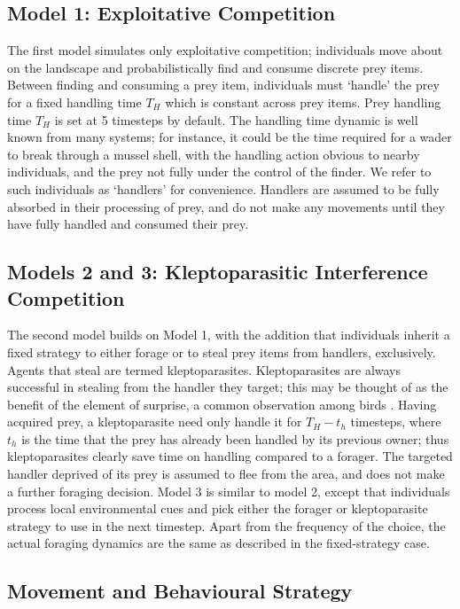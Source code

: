 \documentclass[11pt]{article}
\begin{document}
\subsection{Model 1: Exploitative Competition}

The first model simulates only exploitative competition; individuals move about on the landscape and probabilistically find and consume discrete prey items.
Between finding and consuming a prey item, individuals must `handle' the prey for a fixed handling time $T_H$ which is constant across prey items.
Prey handling time $T_H$ is set at 5 timesteps by default.
The handling time dynamic is well known from many systems; for instance, it could be the time required for a wader to break through a mussel shell, with the handling action obvious to nearby individuals, and the prey not fully under the control of the finder.
We refer to such individuals as `handlers' for convenience.
Handlers are assumed to be fully absorbed in their processing of prey, and do not make any movements until they have fully handled and consumed their prey.

\subsection{Models 2 and 3: Kleptoparasitic Interference Competition}

The second model builds on Model 1, with the addition that individuals inherit a fixed strategy to either forage or to steal prey items from handlers, exclusively.
Agents that steal are termed kleptoparasites.
Kleptoparasites are always successful in stealing from the handler they target; this may be thought of as the benefit of the element of surprise, a common observation among birds \cite{brockmann1979}.
Having acquired prey, a kleptoparasite need only handle it for $T_H - t_h$ timesteps, where $t_h$ is the time that the prey has already been handled by its previous owner; thus kleptoparasites clearly save time on handling compared to a forager.
The targeted handler deprived of its prey is assumed to flee from the area, and does not make a further foraging decision.
Model 3 is similar to model 2, except that individuals process local environmental cues and pick either the forager or kleptoparasite strategy to use in the next timestep.
Apart from the frequency of the choice, the actual foraging dynamics are the same as described in the fixed-strategy case.

\subsection{Movement and Behavioural Strategy}
\end{document}
